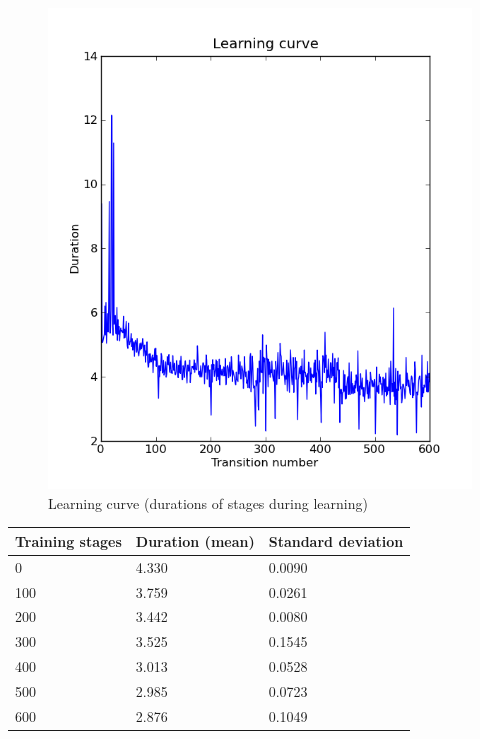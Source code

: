\documentclass[11pt]{article}
\begin{document}
  \begin{figure}[H]
    \begin{center}
    \includegraphics[width=1\textwidth]{img/learning_curve}
    \caption{Learning curve (durations of stages during learning)}
    \label{fig:learning_curve}
    \end{center}
  \end{figure}

\begin{center}
 \begin{tabular}{ l | l | l }
 \textbf{Training stages} & \textbf{Duration (mean)} & \textbf{Standard deviation} \\ \hline
   0    & 4.330 & 0.0090 \\
 100    & 3.759 & 0.0261 \\
 200    & 3.442 & 0.0080 \\
 300    & 3.525 & 0.1545 \\
 400    & 3.013 & 0.0528 \\
 500    & 2.985 & 0.0723 \\
 600    & 2.876 & 0.1049
 \label{tab:means}
 \end{tabular}
\end{center}
\end{document}
